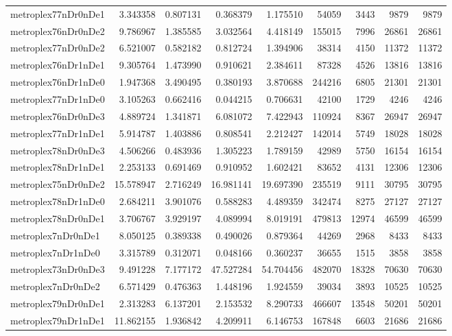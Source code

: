 \begin{longtable}{|l|r|r|r|r|r|r|r|r|}
metroplex77nDr0nDe1 & 3.343358 & 0.807131 & 0.368379 & 1.175510 & 54059 & 3443 & 9879 & 9879 \\
metroplex76nDr0nDe2 & 9.786967 & 1.385585 & 3.032564 & 4.418149 & 155015 & 7996 & 26861 & 26861 \\
metroplex77nDr0nDe2 & 6.521007 & 0.582182 & 0.812724 & 1.394906 & 38314 & 4150 & 11372 & 11372 \\
metroplex76nDr1nDe1 & 9.305764 & 1.473990 & 0.910621 & 2.384611 & 87328 & 4526 & 13816 & 13816 \\
metroplex76nDr1nDe0 & 1.947368 & 3.490495 & 0.380193 & 3.870688 & 244216 & 6805 & 21301 & 21301 \\
metroplex77nDr1nDe0 & 3.105263 & 0.662416 & 0.044215 & 0.706631 & 42100 & 1729 & 4246 & 4246 \\
metroplex76nDr0nDe3 & 4.889724 & 1.341871 & 6.081072 & 7.422943 & 110924 & 8367 & 26947 & 26947 \\
metroplex77nDr1nDe1 & 5.914787 & 1.403886 & 0.808541 & 2.212427 & 142014 & 5749 & 18028 & 18028 \\
metroplex78nDr0nDe3 & 4.506266 & 0.483936 & 1.305223 & 1.789159 & 42989 & 5750 & 16154 & 16154 \\
metroplex78nDr1nDe1 & 2.253133 & 0.691469 & 0.910952 & 1.602421 & 83652 & 4131 & 12306 & 12306 \\
metroplex75nDr0nDe2 & 15.578947 & 2.716249 & 16.981141 & 19.697390 & 235519 & 9111 & 30795 & 30795 \\
metroplex78nDr1nDe0 & 2.684211 & 3.901076 & 0.588283 & 4.489359 & 342474 & 8275 & 27127 & 27127 \\
metroplex78nDr0nDe1 & 3.706767 & 3.929197 & 4.089994 & 8.019191 & 479813 & 12974 & 46599 & 46599 \\
metroplex7nDr0nDe1 & 8.050125 & 0.389338 & 0.490026 & 0.879364 & 44269 & 2968 & 8433 & 8433 \\
metroplex7nDr1nDe0 & 3.315789 & 0.312071 & 0.048166 & 0.360237 & 36655 & 1515 & 3858 & 3858 \\
metroplex73nDr0nDe3 & 9.491228 & 7.177172 & 47.527284 & 54.704456 & 482070 & 18328 & 70630 & 70630 \\
metroplex7nDr0nDe2 & 6.571429 & 0.476363 & 1.448196 & 1.924559 & 39034 & 3893 & 10525 & 10525 \\
metroplex79nDr0nDe1 & 2.313283 & 6.137201 & 2.153532 & 8.290733 & 466607 & 13548 & 50201 & 50201 \\
metroplex79nDr1nDe1 & 11.862155 & 1.936842 & 4.209911 & 6.146753 & 167848 & 6603 & 21686 & 21686 \\

\end{longtable}
